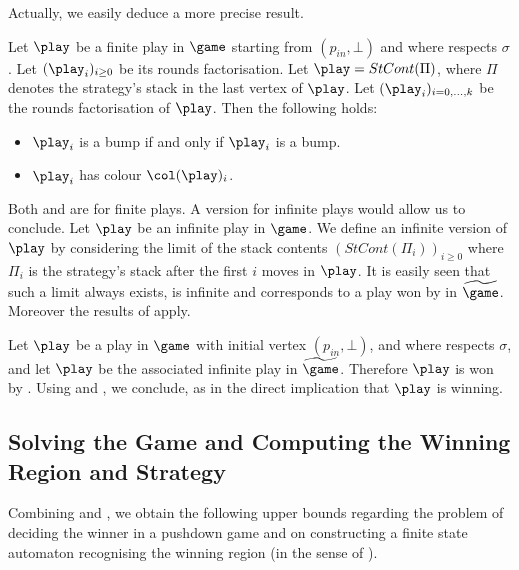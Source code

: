 Actually, we easily deduce a more precise result.

\begin{lemma}\label{10-lemme:toto_paritexp}
Let $\play$ be a finite play in $\game$ starting from
$(p_{in},\bot)$ and where \Eve respects $\sigma$. Let $(\play_i)_{i\geq 0}$ be its rounds factorisation. Let
$\play=StCont(\Pi)$, where $\Pi$ denotes the strategy's
stack in the last vertex of $\play$. Let
$(\play_i)_{i=0,\dots,k}$ be the rounds factorisation of $\play$.
Then the following holds:
\begin{itemize}
\item $\play_i$ is a bump if and only if ${\play}_i$ is a bump.

\item $\play_i$ has colour $\pdscol{\play}_i$.
\end{itemize}
\end{lemma}

Both  and
 are for finite plays. A version for
infinite plays would allow us to conclude. Let $\play$
be an infinite play in $\game$. We define an
infinite version of $\play$ by considering the limit of the stack
contents $(StCont(\Pi_i))_{i\geq 0}$ where $\Pi_i$ is the
strategy's stack after the first $i$ moves in $\play$. %
It is easily seen that such a limit
always exists, is infinite and corresponds to a play won by \Eve in $\fgame$.
Moreover the results of  apply.


Let $\play$ be a play in $\game$ with initial
vertex $(p_{in},\bot)$, and where \Eve respects $\sigma$,
and let $\play$ be the associated infinite play in $\fgame$.
Therefore $\play$ is won by \Eve. Using  and ,
we conclude, as in the direct implication that $\play$ is
winning.


\subsection{Solving the Game and Computing the Winning Region and Strategy}
\label{10-subsec:computing-all}

Combining  and , we obtain the following upper bounds regarding the problem of deciding the winner in a pushdown game and on constructing a finite state automaton recognising the winning region (in the sense of ).

